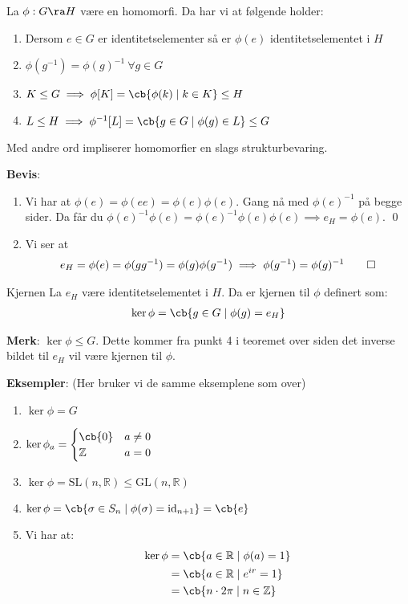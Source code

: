 \begin{theorem*}{13.12}{}
	La $\phi:G\ra H$ være en homomorfi. Da har vi at følgende holder:
	\begin{enumerate}
		\item Dersom $e\in G$ er identitetselementer så er $\phi(e)$ identitetselementet i $H$
		\item $\phi(g^{-1})=\phi(g)^{-1}\ \forall g\in G$
		\item $K\leq G\implies \phi[K]=\cb{\phi(k)\mid k\in K}\leq H$
		\item $L\leq H\implies \phi^{-1}[L]=\cb{g\in G\mid \phi(g)\in L}\leq G$
	\end{enumerate}
	Med andre ord impliserer homomorfier en slags strukturbevaring.
\end{theorem*}

\textbf{Bevis}:
\begin{enumerate}
	\item Vi har at $\phi(e)=\phi(ee)=\phi(e)\phi(e)$. Gang nå med $\phi(e)^{-1}$ på begge sider.
	      Da får du $\phi(e)^{-1}\phi(e)=\phi(e)^{-1}\phi(e)\phi(e)\implies e_H=\phi(e)$. \qed
	\item Vi ser at
	      \begin{align}
		      e_H=\phi(e)=\phi(gg^{-1})=\phi(g)\phi(g^{-1})\implies \phi(g^{-1})=\phi(g)^{-1}\qed
	      \end{align}
\end{enumerate}

\begin{definition}{Kjernen}{}
	La $e_H$ være identitetselementet i $H$. Da er kjernen til $\phi$ definert som:
	\begin{align}
		\ker \phi = \cb{g\in G\mid \phi(g)=e_H}
	\end{align}
\end{definition}

\textbf{Merk}: $\ker \phi \leq G$. Dette kommer fra punkt 4 i teoremet over siden det inverse
bildet til $e_H$ vil være kjernen til $\phi$.

\textbf{Eksempler}: (Her bruker vi de samme eksemplene som over)
\begin{enumerate}
	\item $\ker\phi=G$
	\item $\ker\phi_a=\begin{cases}\cb{0} & a \neq 0 \\ \mathbb{Z} & a=0 \end{cases}$
	\item $\ker\phi = \text{SL}(n, \mathbb{R}) \leq \text{GL}(n, \mathbb{R})$
	\item $\ker\phi = \cb{\sigma\in S_n\mid \phi(\sigma)=\text{id}_{n+1}}=\cb{e}$
	\item Vi har at:
	      \begin{align}
		      \ker\phi & =\cb{a\in \mathbb{R}\mid \phi(a)=1}    \\
		               & =\cb{a\in \mathbb{R}\mid e^{ir}=1}     \\
		               & =\cb{n\cdot 2\pi \mid n\in \mathbb{Z}}
	      \end{align}
\end{enumerate}

